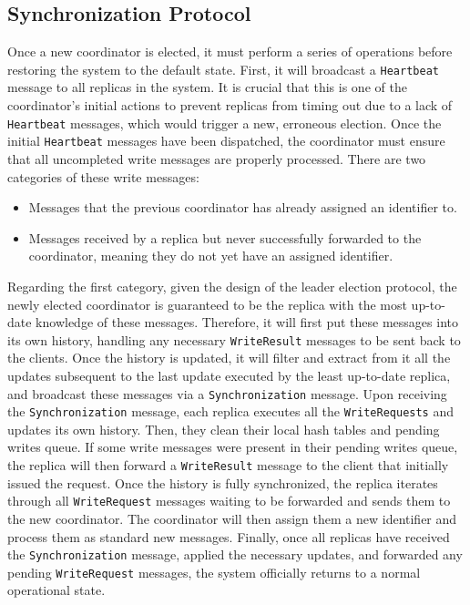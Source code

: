\subsection{Synchronization Protocol}
Once a new coordinator is elected, it must perform a series of operations before restoring the system to the default state.
First, it will broadcast a \texttt{Heartbeat} message to all replicas in the system. It is crucial that this is one of the coordinator's initial actions to prevent replicas from timing out due to a lack of \texttt{Heartbeat} messages, which would trigger a new, erroneous election.
Once the initial \texttt{Heartbeat} messages have been dispatched, the coordinator must ensure that all uncompleted write messages are properly processed. There are two categories of these write messages:
\begin{itemize}
    \item Messages that the previous coordinator has already assigned an identifier to.
    \item Messages received by a replica but never successfully forwarded to the coordinator, meaning they do not yet have an assigned identifier.
\end{itemize}
Regarding the first category, given the design of the leader election protocol, the newly elected coordinator is guaranteed to be the replica with the most up-to-date knowledge of these messages. Therefore, it will first put these messages into its own history,
handling any necessary \texttt{WriteResult} messages to be sent back to the clients. Once the history is updated, it will filter and extract from it all the updates subsequent to the last update executed by the least up-to-date replica, and broadcast these messages via a \texttt{Synchronization} message.
Upon receiving the \texttt{Synchronization} message, each replica executes all the \texttt{WriteRequests} and updates its own history. Then, they clean their local hash tables and pending writes queue. If some write messages were present in their pending writes queue, the replica will then forward a \texttt{WriteResult} message to the client that initially issued the request.
Once the history is fully synchronized, the replica iterates through all \texttt{WriteRequest} messages waiting to be forwarded and sends them to the new coordinator. The coordinator will then assign them a new identifier and process them as standard new messages.
Finally, once all replicas have received the \texttt{Synchronization} message, applied the necessary updates, and forwarded any pending \texttt{WriteRequest} messages, the system officially returns to a normal operational state.
